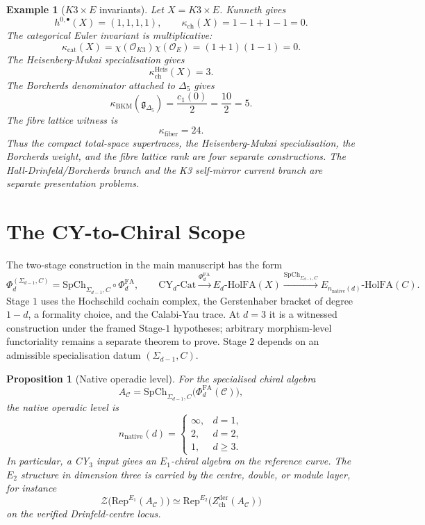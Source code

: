 \documentclass[11pt]{amsart}
\newtheorem{proposition}[theorem]{Proposition}
\newtheorem{example}[theorem]{Example}
\newcommand{\Rep}{\mathrm{Rep}}
\newcommand{\CY}{\mathrm{CY}}
\newcommand{\cC}{\mathcal{C}}
\newcommand{\cO}{\mathcal{O}}
\newcommand{\fg}{\mathfrak{g}}
\newcommand{\PhiFA}{\Phi^{\mathrm{FA}}}
\newcommand{\SpCh}{\mathrm{SpCh}}
\newcommand{\Zchder}{Z_{\mathrm{ch}}^{\mathrm{der}}}
\begin{document}
\begin{example}[\texorpdfstring{$K3\times E$}{K3 x E} invariants]
Let $X=K3\times E$.  Kunneth gives
\[
  h^{0,\bullet}(X)=(1,1,1,1),
  \qquad
  \kappa_{\mathrm{ch}}(X)=1-1+1-1=0.
\]
The categorical Euler invariant is multiplicative:
\[
  \kappa_{\mathrm{cat}}(X)
  =
  \chi(\cO_{K3})\chi(\cO_E)
  =
  (1+1)(1-1)=0.
\]
The Heisenberg-Mukai specialisation gives
\[
  \kappa_{\mathrm{ch}}^{\mathrm{Heis}}(X)=3.
\]
The Borcherds denominator attached to $\Delta_5$ gives
\[
  \kappa_{\mathrm{BKM}}(\fg_{\Delta_5})=\frac{c_1(0)}{2}
  =\frac{10}{2}=5.
\]
The fibre lattice witness is
\[
  \kappa_{\mathrm{fiber}}=24.
\]
Thus the compact total-space supertraces, the Heisenberg-Mukai
specialisation, the Borcherds weight, and the fibre lattice rank are
four separate constructions.  The Hall-Drinfeld/Borcherds branch and
the K3 self-mirror current branch are separate presentation problems.
\end{example}

\section{The CY-to-Chiral Scope}

The two-stage construction in the main manuscript has the form
\[
  \Phi_d^{(\Sigma_{d-1},C)}
  =
  \SpCh_{\Sigma_{d-1},C}\circ\PhiFA_d,
  \qquad
  \CY_d\text{-}\mathrm{Cat}
  \xrightarrow{\PhiFA_d}
  E_d\text{-}\mathrm{HolFA}(X)
  \xrightarrow{\SpCh_{\Sigma_{d-1},C}}
  E_{n_{\mathrm{native}}(d)}\text{-}\mathrm{HolFA}(C).
\]
Stage $1$ uses the Hochschild cochain complex, the Gerstenhaber bracket
of degree $1-d$, a formality choice, and the Calabi-Yau trace.  At
$d=3$ it is a witnessed construction under the framed Stage-$1$
hypotheses; arbitrary morphism-level functoriality remains a
separate theorem to prove.  Stage $2$ depends on an admissible
specialisation datum $(\Sigma_{d-1},C)$.

\begin{proposition}[Native operadic level]
\label{prop:native-operadic-level-note}
For the specialised chiral algebra
\[
  A_\cC=
  \SpCh_{\Sigma_{d-1},C}\bigl(\PhiFA_d(\cC)\bigr),
\]
the native operadic level is
\[
  n_{\mathrm{native}}(d)=
  \begin{cases}
    \infty, & d=1,\\
    2, & d=2,\\
    1, & d\geq3.
  \end{cases}
\]
In particular, a CY$_3$ input gives an $E_1$-chiral algebra on the
reference curve.  The $E_2$ structure in dimension three is carried by
the centre, double, or module layer, for instance
\[
  \mathcal Z\bigl(\Rep^{E_1}(A_\cC)\bigr)
  \simeq
  \Rep^{E_2}\bigl(\Zchder(A_\cC)\bigr)
\]
on the verified Drinfeld-centre locus.
\end{proposition}
\end{document}
